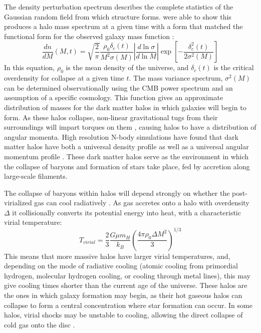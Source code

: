 The density perturbation spectrum describes the complete statistics of the
Gaussian random field from which structure forms. \citet{Press1974} were able to
show this produces a halo mass spectrum at a given time with a form that matched
the functional form for the observed galaxy mass function
\citep{Schechter1976}:
\begin{equation}
    \frac{dn}{dM}(M,t) =
    \sqrt{\frac{2}{\pi}}\frac{\rho_0\delta_c(t)}{M^2\sigma(M)} 
    \left\lvert\frac{d\ln{\sigma}}{d\ln{M}}\right\rvert
    \exp{\left[-\frac{\delta^2_c(t)}{2\sigma^2(M)}\right]}
\end{equation}
In this equation, $\rho_0$ is the mean density of the universe, and
$\delta_c(t)$ is the critical overdensity for collapse at a given time $t$.  The
mass variance spectrum, $\sigma^2(M)$ can be determined observationally using
the CMB power spectrum \citep{Fixsen1996,Spergel2003,Planck2015} and an
assumption of a specific cosmology.  This function gives an approximate
distribution of masses for the dark matter halos in which galaxies will begin to
form.  As these halos collapse, non-linear gravitational tugs from their
surroundings will impart torques on them \citep{Barnes1987}, causing halos to
have a distribution of angular momenta.  High resolution N-body simulations have
found that dark matter halos have both a universal density profile
\citep{Navarro1996,Merritt2006} as well as a universal angular momentum profile
\citep{Bullock2001}.  These dark matter halos serve as the environment in
which the collapse of baryons and formation of stars take place, fed by
accretion along large-scale filaments.

The collapse of baryons within halos will depend strongly on whether the
post-virialized gas can cool radiatively \citep{Rees1977}.  As gas accretes onto
a halo with overdensity $\Delta$ it collisionally converts its potential energy
into heat, with a characteristic virial temperature:
\begin{equation}
    T_{virial} = \frac{2}{3}\frac{G\mu m_H}{k_B}\left({\frac{4\pi\rho_0\Delta
    M^2}{3}}\right)^{1/3}
\end{equation}
This means that more massive halos have larger virial temperatures, and,
depending on the mode of radiative cooling (atomic cooling from primordial
hydrogen, molecular hydrogen cooling, or cooling through metal lines), this may
give cooling times shorter than the current age of the universe.  These halos
are the ones in which galaxy formation may begin, as their hot gaseous halos can
collapse to form a central concentration where star formation can occur.  In
some halos, virial shocks may be unstable to cooling, allowing the direct
collapse of cold gas onto the disc \citep{Birnboim2003}.  


